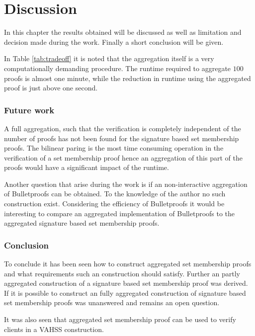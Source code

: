 \chapter{Discussion}
\label{ch:Conslusion}

In this chapter the results obtained will be discussed as well as limitation and decision made during the work. Finally a short conclusion will be given. 

In Table \ref{tab:tradeoff} it is noted that the aggregation itself is a very computationally demanding procedure. The runtime required to aggregate $100$ proofs is almost one minute, while the reduction in runtime using the aggregated proof is just above one second. %







\subsection*{Future work}
A full aggregation, such that the verification is completely independent of the number of proofs has not been found for the signature based set membership proofs. The bilinear paring is the most time consuming operation in the verification of a set membership proof hence an aggregation of this part of the proofs would have a significant impact of the runtime. 

Another question that arise during the work is if an non-interactive aggregation of Bulletproofs can be obtained. To the knowledge of the author no such construction exist. Considering the efficiency of Bulletproofs it would be interesting to compare an aggregated implementation of Bulletproofs to the aggregated signature based set membership proofs. 



 

\subsection*{Conclusion}
To conclude it has been seen how to construct aggregated set membership proofs and what requirements such an construction should satisfy. Further an partly aggregated construction of a signature based set membership proof was derived. If it is possible to construct an fully aggregated construction of signature based set membership proofs was unanswered and remains an open question. 

It was also seen that aggregated set membership proof can be used to verify clients in a VAHSS construction. 






